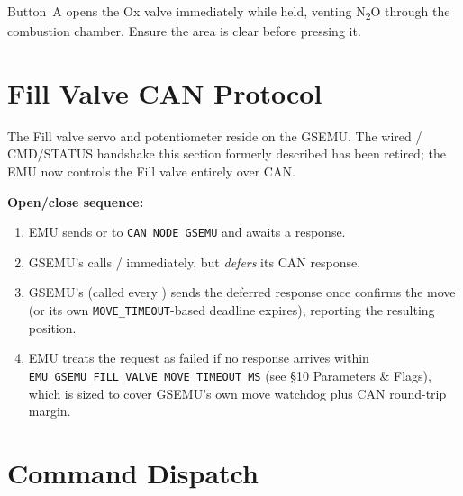 ﻿\documentclass[11pt,letterpaper]{article}
\begin{document}
\begin{warningbox}
Button~A opens the Ox valve immediately while held, venting
N\textsubscript{2}O through the combustion chamber. Ensure the area is
clear before pressing it.
\end{warningbox}

\section{Fill Valve CAN Protocol}

The Fill valve servo and potentiometer reside on the GSEMU. The wired
/ CMD/STATUS handshake this section
formerly described has been retired; the EMU now controls the Fill
valve entirely over CAN.

\textbf{Open/close sequence:}
\begin{sloppypar}
\begin{enumerate}[nosep]
  \item EMU sends  or 
        to \texttt{CAN\_NODE\_GSEMU} and awaits a response.
  \item GSEMU's  calls /
        immediately, but \emph{defers} its CAN response.
  \item GSEMU's  (called every )
        sends the deferred response once 
        confirms the move (or its own \texttt{MOVE\_TIMEOUT}-based deadline
        expires), reporting the resulting position.
  \item EMU treats the request as failed if no response arrives within
        \texttt{EMU\_GSEMU\_FILL\_VALVE\_MOVE\_TIMEOUT\_MS} (see §10
        Parameters \& Flags), which is sized to cover GSEMU's own
        move watchdog plus CAN round-trip margin.
\end{enumerate}
\end{sloppypar}

\section{Command Dispatch}
\end{document}
